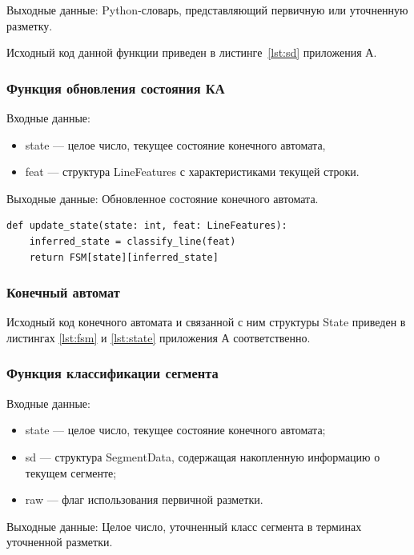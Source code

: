Выходные данные: Python-словарь, представляющий первичную или уточненную разметку.

Исходный код данной функции приведен в листинге~\ref{lst:sd} приложения А.

\subsubsection{Функция обновления состояния КА} %
Входные данные:
\begin{itemize}
    \item state --- целое число, текущее состояние конечного автомата,
    \item feat --- структура LineFeatures с характеристиками текущей строки.
\end{itemize}

Выходные данные: Обновленное состояние конечного автомата.

\begin{lstlisting}[caption={Функция обновления состояния конечного автомата}, label={}]
def update_state(state: int, feat: LineFeatures):
    inferred_state = classify_line(feat)
    return FSM[state][inferred_state]
\end{lstlisting}

\subsubsection*{Конечный автомат} %

Исходный код конечного автомата и связанной с ним структуры State приведен в листингах \ref{lst:fsm} и \ref{lst:state} приложения А соответственно.

\subsubsection{Функция классификации сегмента} %
Входные данные:
\begin{itemize}
    \item state --- целое число, текущее состояние конечного автомата;
    \item sd --- структура SegmentData, содержащая накопленную информацию о текущем сегменте;
    \item raw --- флаг использования первичной разметки.
\end{itemize}

Выходные данные: Целое число, уточненный класс сегмента в терминах уточненной разметки.

